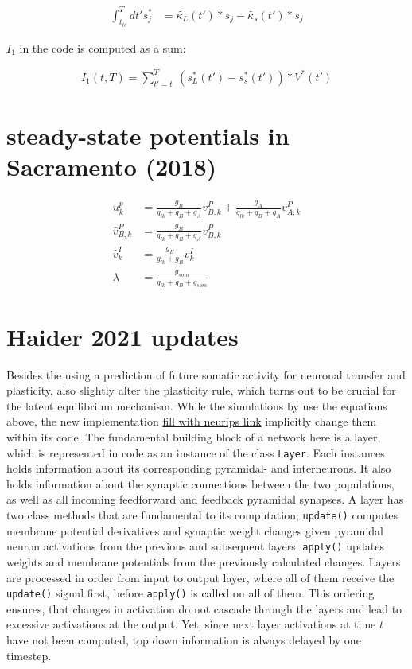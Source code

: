 \begin{align}
  \int_{t_{ls}}^T dt' s_j^* & =  \tilde{\kappa_L}(t') * s_j -  \tilde{\kappa_s}(t') * s_j
\end{align}

$I_1$ in the code is computed as a sum:

\begin{align}
  I_1 (t,T) = \sum_{t'=t}^T \ (s_L^*(t') - s_s^*(t')) * V^*(t')
\end{align}


\section{steady-state potentials in Sacramento (2018)}

\begin{align}
  u_k^p           & = \frac{g_B}{g_{lk} + g_B + g_A} v^P_{B,k} + \frac{g_A}{g_{lk} + g_B + g_A} v^P_{A,k} \\
  \hat{v}^P_{B,k} & = \frac{g_B}{g_{lk} + g_B + g_A} v^P_{B,k}                                            \\
  \hat{v}^I_{k}   & = \frac{g_B}{g_{lk} + g_B} v^I_{k}                                                    \\
  \lambda         & = \frac{g_{som}}{g_{lk} + g_B + g_{som}}
\end{align}



\section{Haider 2021 updates}

Besides the using a prediction of future somatic activity for neuronal transfer and plasticity, \cite{Haider2021} also
slightly alter the plasticity rule, which turns out to be crucial for the latent equilibrium mechanism. While the
simulations by \cite{sacramento2018dendritic} use the equations above, the new implementation
\href{https://github.com/neurips}{fill with neurips link} implicitly change them within its code. The fundamental
building block of a network here is a layer, which is represented in code as an instance of the class \texttt{Layer}.
Each instances holds information about its corresponding pyramidal- and interneurons. It also holds information about
the synaptic connections between the two populations, as well as all incoming feedforward and feedback pyramidal
synapses. A layer has two class methods that are fundamental to its computation; \texttt{update()} computes membrane
potential derivatives and synaptic weight changes given pyramidal neuron activations from the previous and subsequent
layers. \texttt{apply()} updates weights and membrane potentials from the previously calculated changes. Layers are
processed in order from input to output layer, where all of them receive the \texttt{update()} signal first, before
\texttt{apply()} is called on all of them. This ordering ensures, that changes in activation do not cascade through the
layers and lead to excessive activations at the output. Yet, since next layer activations at time $t$ have not been
computed, top down information is always delayed by one timestep.


